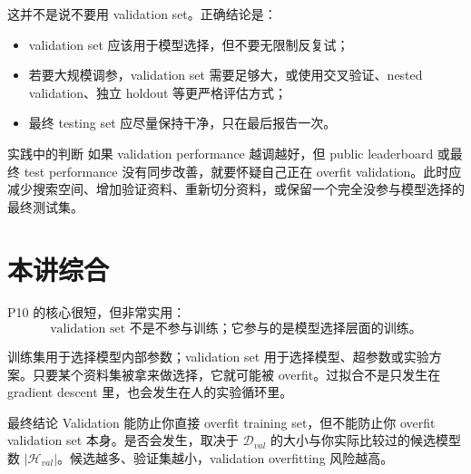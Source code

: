 \documentclass[a4paper]{article}
\newcommand{\Dval}{\mathcal{D}_{val}}
\newcommand{\Hval}{\mathcal{H}_{val}}
\begin{document}
这并不是说不要用 validation set。正确结论是：
\begin{itemize}
    \item validation set 应该用于模型选择，但不要无限制反复试；
    \item 若要大规模调参，validation set 需要足够大，或使用交叉验证、nested validation、独立 holdout 等更严格评估方式；
    \item 最终 testing set 应尽量保持干净，只在最后报告一次。
\end{itemize}

\begin{knowledgebox}{实践中的判断}
    如果 validation performance 越调越好，但 public leaderboard 或最终 test performance 没有同步改善，就要怀疑自己正在 overfit validation。此时应减少搜索空间、增加验证资料、重新切分资料，或保留一个完全没参与模型选择的最终测试集。
\end{knowledgebox}

\section{本讲综合}

P10 的核心很短，但非常实用：
\[
    \text{validation set 不是不参与训练；它参与的是模型选择层面的训练。}
\]

训练集用于选择模型内部参数；validation set 用于选择模型、超参数或实验方案。只要某个资料集被拿来做选择，它就可能被 overfit。过拟合不是只发生在 gradient descent 里，也会发生在人的实验循环里。

\begin{importantbox}{最终结论}
    Validation 能防止你直接 overfit training set，但不能防止你 overfit validation set 本身。是否会发生，取决于 $\Dval$ 的大小与你实际比较过的候选模型数 $|\Hval|$。候选越多、验证集越小，validation overfitting 风险越高。
\end{importantbox}
\end{document}
